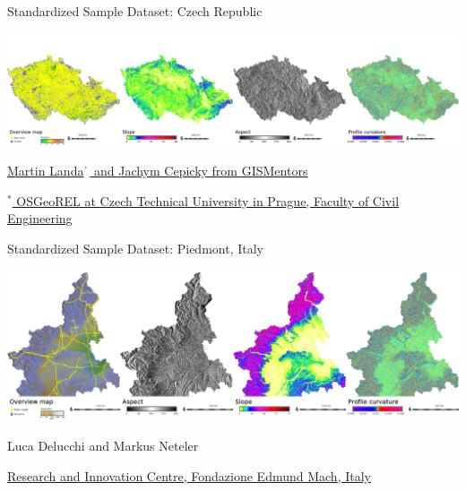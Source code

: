 \documentclass[xcolor={dvipsnames,usenames},beamer]{beamer}
\newcommand{\n}[1]{$^{\textcolor{gray}{\mbox{\tiny{#1}}}}$}
\begin{document}
\begin{frame}{Standardized Sample Dataset: Czech Republic}

\begin{center}
\includegraphics[width=\textwidth]{./images/dataset/std_dataset_cz_stripe.png}
\end{center}

\href{http://gismentors.eu/}{Martin Landa\n{*} and Jachym Cepicky from GISMentors}

\bigskip

$^*$\href{http://geomatics.fsv.cvut.cz/research/osgeorel/}%
{\scriptsize
OSGeoREL
at Czech Technical University in Prague,
Faculty of Civil Engineering
}

\end{frame}

\begin{frame}{Standardized Sample Dataset: Piedmont, Italy}

\begin{center}
\includegraphics[width=\textwidth]{./images/dataset/std_dataset_it_stripe.png}
\end{center}


Luca Delucchi and Markus Neteler

{\scriptsize
\href{http://gis.cri.fmach.it/}{Research and Innovation Centre, Fondazione Edmund Mach, Italy}
}

\end{frame}
\end{document}
